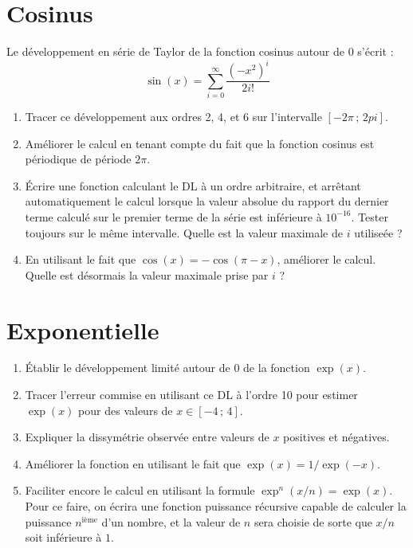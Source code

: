 \section{Cosinus}
Le développement en série de Taylor de la fonction cosinus autour de $0$ s'écrit : 
\begin{equation}
\sin(x) = \sum_{i=0}^\infty \frac{(-x^{2})^i}{2i!} 
\end{equation}
\begin{enumerate}
\item Tracer ce développement aux ordres 2, 4, et 6 sur l'intervalle $[-2\pi\,;\,2pi]$.
\item Améliorer le calcul en tenant compte du fait que la fonction cosinus est
périodique de période $2\pi$. 
\item Écrire une fonction calculant le DL à un ordre arbitraire, et arrêtant automatiquement le calcul lorsque la valeur absolue du rapport 
du dernier terme calculé sur le premier terme de la série est inférieure à $10^{-16}$. Tester toujours sur le même intervalle. Quelle est la valeur maximale de $i$ utiliseée ? 
\item En utilisant le fait que $\cos(x) = -\cos(\pi-x)$, améliorer le calcul. Quelle
est désormais la valeur maximale prise par $i$ ?
 \end{enumerate}
\section{Exponentielle}
\begin{enumerate}
\item Établir le développement limité autour de 0 de la fonction $\exp(x)$.
\item Tracer l'erreur commise en utilisant ce DL à l'ordre 10 pour estimer $\exp(x)$
pour des valeurs de $x \in [-4\,;\,4]$.
\item Expliquer la dissymétrie observée entre 
valeurs de $x$ positives et négatives. 
\item Améliorer la fonction en utilisant le fait que $\exp(x) = 1/\exp(-x)$.
\item Faciliter encore le calcul en utilisant la formule $\exp^n(x/n) = \exp(x)$. 
Pour ce faire, on écrira une fonction puissance 
récursive  capable
de calculer la puissance $n^\textrm{ième}$ d'un nombre, et la valeur de $n$ 
sera choisie de sorte que $x/n$ soit inférieure à $1$. 
\end{enumerate}

